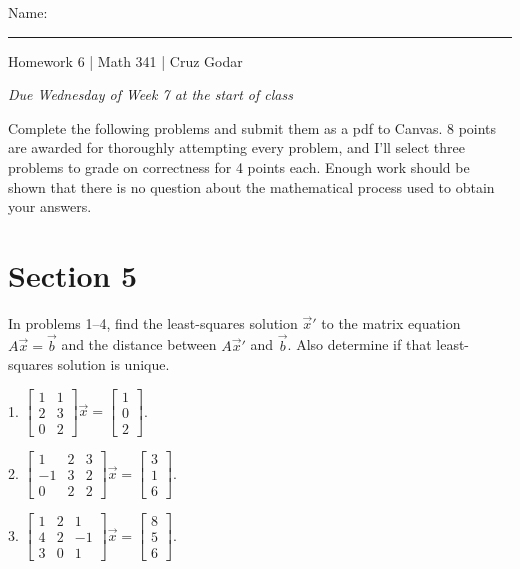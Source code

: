 \documentclass{article}
\begin{document}
\Large Name: \rule{2in}{0.15mm} \hfill Homework 6 | Math 341 | Cruz Godar \vspace{4pt} \normalsize

\textit{Due Wednesday of Week 7 at the start of class}

Complete the following problems and submit them as a pdf to Canvas. 8 points are awarded for thoroughly attempting every problem, and I'll select three problems to grade on correctness for 4 points each. Enough work should be shown that there is no question about the mathematical process used to obtain your answers.

\section{Section 5}

In problems 1--4, find the least-squares solution $\vec{x}'$ to the matrix equation $A\vec{x} = \vec{b}$ and the distance between $A\vec{x}'$ and $\vec{b}$. Also determine if that least-squares solution is unique.

1. $\left[\begin{array}{cc} 1& 1 \\ 2& 3 \\ 0& 2 \end{array}\right]\vec{x} = \left[\begin{array}{c} 1 \\ 0 \\ 2 \end{array}\right]$.

2. $\left[\begin{array}{ccc} 1& 2& 3 \\ -1& 3& 2 \\ 0& 2& 2 \end{array}\right]\vec{x} = \left[\begin{array}{c} 3 \\ 1 \\ 6 \end{array}\right]$.

3. $\left[\begin{array}{ccc} 1& 2& 1 \\ 4& 2& -1 \\ 3& 0& 1 \end{array}\right]\vec{x} = \left[\begin{array}{c} 8 \\ 5 \\ 6 \end{array}\right]$.
\end{document}
